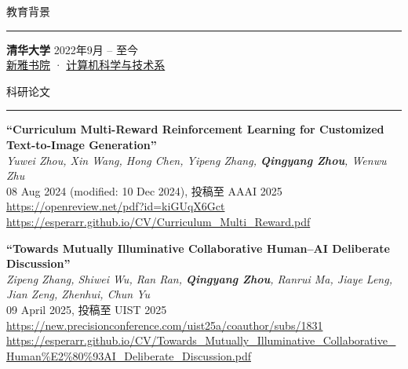 \documentclass{resume} %
\renewenvironment{rSection}[1]{
\sectionskip
\textcolor{TsinghuaPurple}{\MakeUppercase{#1}}
\sectionlineskip
\hrule
\begin{list}{}{
\setlength{\leftmargin}{0em}
}
\item[]
}{
\end{list}
}
\begin{document}
  


\begin{rSection}{教育背景}

\textbf{清华大学} \hfill 2022年9月 -- 至今\\
\href{https://www.xyc.tsinghua.edu.cn/index.htm}{新雅书院} · 
\href{https://www.cs.tsinghua.edu.cn/}{计算机科学与技术系}

\end{rSection}

\begin{rSection}{科研论文}
\item
\textbf{``Curriculum Multi-Reward Reinforcement Learning for Customized Text-to-Image Generation''}\\
\textit{Yuwei Zhou, Xin Wang, Hong Chen, Yipeng Zhang, \textbf{Qingyang Zhou}, Wenwu Zhu}\\
08 Aug 2024 (modified: 10 Dec 2024), 投稿至 AAAI 2025\\
\url{https://openreview.net/pdf?id=kiGUqX6Gct}\\
\url{https://esperarr.github.io/CV/Curriculum_Multi_Reward.pdf}

\item
\textbf{``Towards Mutually Illuminative Collaborative Human--AI Deliberate Discussion''}\\
\textit{Zipeng Zhang, Shiwei Wu, Ran Ran, \textbf{Qingyang Zhou}, Ranrui Ma, Jiaye Leng, Jian Zeng, Zhenhui, Chun Yu}\\
09 April 2025, 投稿至 UIST 2025\\
\url{https://new.precisionconference.com/uist25a/coauthor/subs/1831}\\
\url{https://esperarr.github.io/CV/Towards_Mutually_Illuminative_Collaborative_Human%E2%80%93AI_Deliberate_Discussion.pdf}
\end{rSection}

\end{document}
